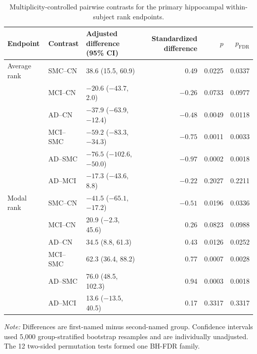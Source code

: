 \documentclass{article}
\begin{document}
\begin{table}[!htbp]
\centering
\caption{Multiplicity-controlled pairwise contrasts for the primary hippocampal within-subject rank endpoints.}
\label{tab:primary_pairwise_contrasts}
\scriptsize
\begin{tabular}{lllrrr}
\toprule
Endpoint & Contrast & Adjusted difference (95\% CI) & Standardized difference & $p$ & $p_{\mathrm{FDR}}$\\
\midrule
Average rank & SMC--CN & 38.6 (15.5, 60.9) & 0.49 & 0.0225 & 0.0337\\
& MCI--CN & $-20.6$ ($-43.7$, 2.0) & $-0.26$ & 0.0733 & 0.0977\\
& AD--CN & $-37.9$ ($-63.9$, $-12.4$) & $-0.48$ & 0.0049 & 0.0118\\
& MCI--SMC & $-59.2$ ($-83.3$, $-34.3$) & $-0.75$ & 0.0011 & 0.0033\\
& AD--SMC & $-76.5$ ($-102.6$, $-50.0$) & $-0.97$ & 0.0002 & 0.0018\\
& AD--MCI & $-17.3$ ($-43.6$, 8.8) & $-0.22$ & 0.2027 & 0.2211\\
\addlinespace
Modal rank & SMC--CN & $-41.5$ ($-65.1$, $-17.2$) & $-0.51$ & 0.0196 & 0.0336\\
& MCI--CN & 20.9 ($-2.3$, 45.6) & 0.26 & 0.0823 & 0.0988\\
& AD--CN & 34.5 (8.8, 61.3) & 0.43 & 0.0126 & 0.0252\\
& MCI--SMC & 62.3 (36.4, 88.2) & 0.77 & 0.0007 & 0.0028\\
& AD--SMC & 76.0 (48.5, 102.3) & 0.94 & 0.0003 & 0.0018\\
& AD--MCI & 13.6 ($-13.5$, 40.5) & 0.17 & 0.3317 & 0.3317\\
\bottomrule
\end{tabular}
\par\vspace{1mm}
\footnotesize{\textit{Note:} Differences are first-named minus second-named group. Confidence intervals used 5,000 group-stratified bootstrap resamples and are individually unadjusted. The 12 two-sided permutation tests formed one BH-FDR family.}
\end{table}
\end{document}
